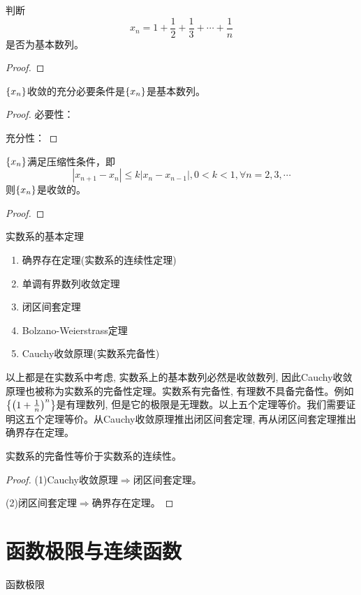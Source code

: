 \documentclass[lang=cn]{elegantbook}
\begin{document}
\begin{proposition}
    判断
    \[ x_n = 1 + \frac{1}{2} + \frac{1}{3} + \cdots + \frac{1}{n} \]
    是否为基本数列。
\end{proposition}
\begin{proof}

\end{proof}

\begin{theorem}[Cauchy收敛原理]
    $\left\{ x_n\right\}$收敛的充分必要条件是$\left\{ x_n\right\}$是基本数列。
\end{theorem}
\begin{proof}
必要性：

充分性：
\end{proof}

\begin{proposition}
    $\left\{ x_n\right\}$满足压缩性条件，即
    \[ \left| x_{n+1} -x_n \right| \le k\left| x_n - x_{n-1}\right|, 0 < k < 1, \forall n = 2, 3, \cdots \] 
    则$\left\{ x_n\right\}$是收敛的。
\end{proposition}
\begin{proof}

\end{proof}

实数系的基本定理
\begin{enumerate}
    \item 确界存在定理(实数系的连续性定理)
    \item 单调有界数列收敛定理
    \item 闭区间套定理
    \item Bolzano-Weierstrass定理
    \item Cauchy收敛原理(实数系完备性)
\end{enumerate}
以上都是在实数系中考虑, 实数系上的基本数列必然是收敛数列, 因此Cauchy收敛原理也被称为实数系的完备性定理。实数系有完备性, 有理数不具备完备性。例如$\left\{ \left( 1 + \frac{1}{n}\right)^n\right\}$是有理数列, 但是它的极限是无理数。以上五个定理等价。我们需要证明这五个定理等价。从Cauchy收敛原理推出闭区间套定理, 再从闭区间套定理推出确界存在定理。
\begin{theorem}
    实数系的完备性等价于实数系的连续性。
\end{theorem}
\begin{proof}
    (1)Cauchy收敛原理$\Rightarrow$闭区间套定理。

    (2)闭区间套定理$\Rightarrow$确界存在定理。
\end{proof}

\chapter{函数极限与连续函数}
函数极限
\end{document}
